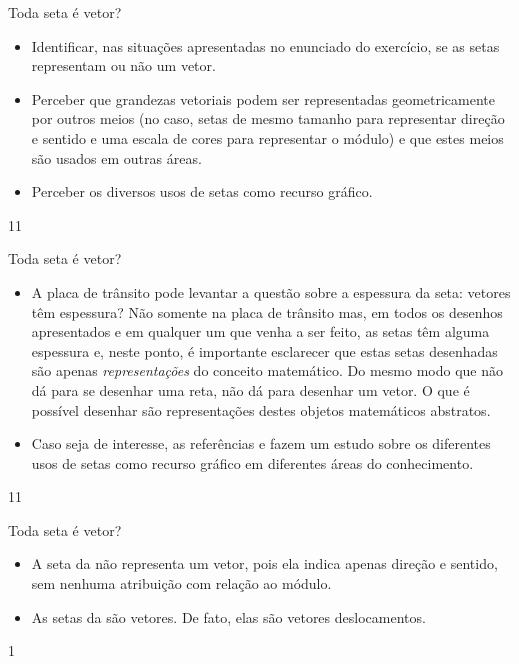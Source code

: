 \clearpage
\def\currentcolor{session2}
\begin{objectives}{Toda seta é vetor?}
{
\begin{itemize}
\item {} 
Identificar, nas situações apresentadas no enunciado do exercício, se as setas representam ou não um vetor.

\item {} 
Perceber que grandezas vetoriais podem ser representadas geometricamente por outros meios (no caso, setas de mesmo tamanho para representar direção e sentido e uma escala de cores para representar o módulo) e que estes meios são usados em outras áreas.

\item {} 
Perceber os diversos usos de setas como recurso gráfico.

\end{itemize}
}{1}{1}
\end{objectives}
\begin{sugestions}{Toda seta é vetor?}
{
\begin{itemize}
\item {} 
A placa de trânsito pode levantar a questão sobre a espessura da seta: vetores têm espessura? Não somente na placa de trânsito mas, em todos os desenhos apresentados e em qualquer um que venha a ser feito, as setas têm alguma espessura e, neste ponto, é importante esclarecer que estas setas desenhadas são apenas \textit{representações} do conceito matemático. Do mesmo modo que não dá para se desenhar uma reta, não dá para desenhar um vetor. O que é possível desenhar são representações destes objetos matemáticos abstratos.

\item {} 
Caso seja de interesse, as referências \citep{horn1998} e \citep{wong2011} fazem um estudo sobre os diferentes usos de setas como recurso gráfico em diferentes áreas do conhecimento.

\end{itemize}
}{1}{1}
\end{sugestions}
\begin{answer}{Toda seta é vetor?}
{
\begin{itemize}
\item {} 
A seta da \hyperref[\detokenize{GE101-0C:fig-geometria-flechas-01}]{} não representa um vetor, pois ela indica apenas direção e sentido, sem nenhuma atribuição com relação ao módulo.

\item {} 
As setas da \hyperref[\detokenize{GE101-0C:fig-geometria-flechas-02}]{} são vetores. De fato, elas são vetores deslocamentos.
\end{itemize}
}{1}
\end{answer}
